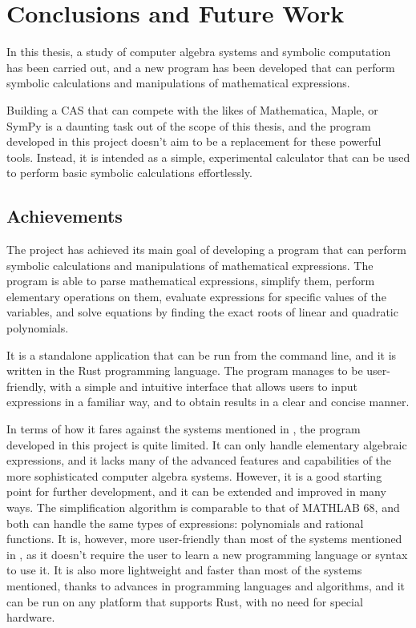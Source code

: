 \chapter{Conclusions and Future Work}\label{chap:conclusions}

In this thesis, a study of computer algebra systems and symbolic computation has been carried out, and a new program has been developed that can perform symbolic calculations and manipulations of mathematical expressions.

Building a CAS that can compete with the likes of Mathematica, Maple, or SymPy is a daunting task out of the scope of this thesis, and the program developed in this project doesn't aim to be a replacement for these powerful tools. Instead, it is intended as a simple, experimental calculator that can be used to perform basic symbolic calculations effortlessly.

\section{Achievements}\label{sec:results}

The project has achieved its main goal of developing a program that can perform symbolic calculations and manipulations of mathematical expressions. The program is able to parse mathematical expressions, simplify them, perform elementary operations on them, evaluate expressions for specific values of the variables, and solve equations by finding the exact roots of linear and quadratic polynomials.

It is a standalone application that can be run from the command line, and it is written in the Rust programming language. The program manages to be user-friendly, with a simple and intuitive interface that allows users to input expressions in a familiar way, and to obtain results in a clear and concise manner.

In terms of how it fares against the systems mentioned in , the program developed in this project is quite limited. It can only handle elementary algebraic expressions, and it lacks many of the advanced features and capabilities of the more sophisticated computer algebra systems. However, it is a good starting point for further development, and it can be extended and improved in many ways. The simplification algorithm is comparable to that of MATHLAB 68, and both can handle the same types of expressions: polynomials and rational functions. It is, however, more user-friendly than most of the systems mentioned in , as it doesn't require the user to learn a new programming language or syntax to use it. It is also more lightweight and faster than most of the systems mentioned, thanks to advances in programming languages and algorithms, and it can be run on any platform that supports Rust, with no need for special hardware.


